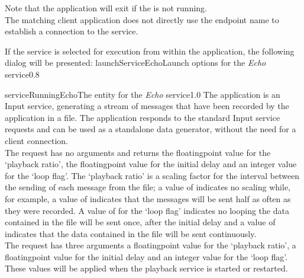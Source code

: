 Note that the application will exit if the  is not
running.\\

\insertAutoAppParameters
{}
The matching client application does not directly use the endpoint name to establish a
connection to the service.

If the service is selected for execution from within the \emph{\MMMU} application, the
following dialog will be presented:
%
{launchServiceEcho}{Launch options for the \emph{Echo} service}{0.8}

%
{serviceRunningEcho}{The \emph{\MMMU} entity for the \emph{Echo} service}{1.0}
The  application is an Input
service, generating a stream of \yarp{} messages that have been recorded by the
 application in a file.
The application responds to the standard Input service requests and can be used as a
standalone data generator, without the need for a client connection.\\

The  request has no arguments and
returns the floating\longDash{}point value for the `playback ratio', the
floating\longDash{}point value for the initial delay and an integer value for the
`loop flag'.
The `playback ratio' is a scaling factor for the interval between the sending of each
message from the file; a value of  indicates no scaling while, for example,
a value of  indicates that the messages will be sent half as often as they
were recorded.
A value of  for the `loop flag' indicates no looping \longDash{} the data
contained in the file will be sent once, after the initial delay \longDash{} and a value
of  indicates that the data contained in the file will be sent
continuously.\\

The  request has three arguments
\longDash{} a floating\longDash{}point value for the `playback ratio', a
floating\longDash{}point value for the initial delay and an integer value for the
`loop flag'.
These values will be applied when the playback service is started or restarted.\\

